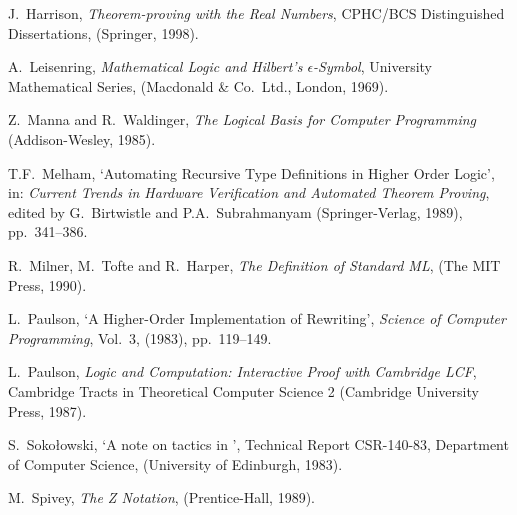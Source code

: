 \begin{thebibliography}{99}
J.\ Harrison,
{\it Theorem-proving with the Real Numbers},
{\rm CPHC/BCS Distinguished Dissertations},
(Springer, 1998).

A.\ Leisenring,
{\it Mathematical Logic and Hilbert's $\epsilon$-Symbol\/},
{\rm University Mathematical Series},
(Macdonald \& Co.\ Ltd., London, 1969).

Z.\ Manna and R.\ Waldinger,
{\it The Logical Basis for Computer Programming\/}
(Addison-Wesley, 1985).

T{}.F{}.\ Melham, `{}Automating Recursive Type Definitions
in Higher Order Logic',
in: {\it Current Trends in Hardware Verification and
Automated Theorem Proving\/}, edited by G.\ Birtwistle
and P.A.\ Subrahmanyam
(Springer-Verlag, 1989), pp.\ 341--386.

R.\ Milner, M.\ Tofte and R.\ Harper,
{\it The Definition of Standard ML\/},
(The MIT Press, 1990).

L.\ Paulson,
`{}A Higher-Order Implementation of Rewriting',
{\it Science of Computer Programming}, Vol.\ 3, (1983), pp.\ 119--149.

 L.\ Paulson,
{\it Logic and Computation: Interactive Proof with Cambridge LCF},
Cambridge Tracts in Theoretical Computer Science 2
(Cambridge University Press, 1987).

%
S.\ Soko\l owski, `{}A note on tactics in \LCF',
Technical Report CSR-140-83, Department of Computer Science,
(University of Edinburgh, 1983).


M.\ Spivey,
{\it The Z Notation}, (Prentice-Hall, 1989).

\end{thebibliography}



